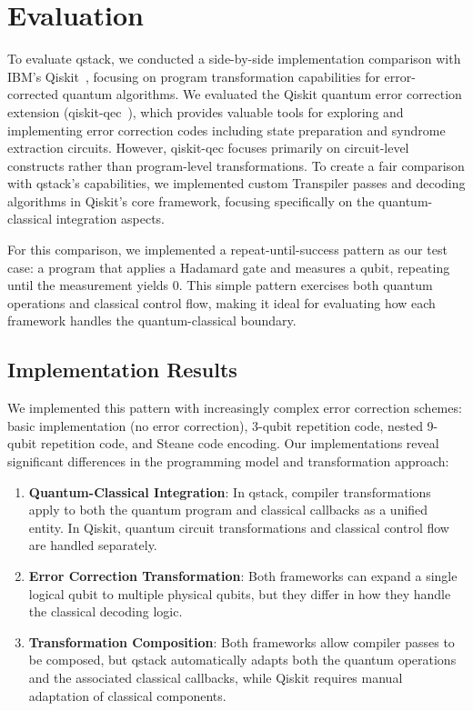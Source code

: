\section{Evaluation}\label{sec:evaluation}

To evaluate qstack, we conducted a side-by-side implementation comparison with IBM's Qiskit~\cite{Qiskit}, focusing on program transformation capabilities for error-corrected quantum algorithms. We evaluated the Qiskit quantum error correction extension (qiskit-qec~\cite{qiskit-qec}), which provides valuable tools for exploring and implementing error correction codes including state preparation and syndrome extraction circuits. However, qiskit-qec focuses primarily on circuit-level constructs rather than program-level transformations. To create a fair comparison with qstack's capabilities, we implemented custom Transpiler passes and decoding algorithms in Qiskit's core framework, focusing specifically on the quantum-classical integration aspects.

For this comparison, we implemented a repeat-until-success pattern as our test case: a program that applies a Hadamard gate and measures a qubit, repeating until the measurement yields 0. This simple pattern exercises both quantum operations and classical control flow, making it ideal for evaluating how each framework handles the quantum-classical boundary.

\subsection{Implementation Results}

We implemented this pattern with increasingly complex error correction schemes: basic implementation (no error correction), 3-qubit repetition code, nested 9-qubit repetition code, and Steane code encoding. Our implementations reveal significant differences in the programming model and transformation approach:

\begin{enumerate}
\item \textbf{Quantum-Classical Integration}: In qstack, compiler transformations apply to both the quantum program and classical callbacks as a unified entity. In Qiskit, quantum circuit transformations and classical control flow are handled separately.

\item \textbf{Error Correction Transformation}: Both frameworks can expand a single logical qubit to multiple physical qubits, but they differ in how they handle the classical decoding logic.

\item \textbf{Transformation Composition}: Both frameworks allow compiler passes to be composed, but qstack automatically adapts both the quantum operations and the associated classical callbacks, while Qiskit requires manual adaptation of classical components.
\end{enumerate}

